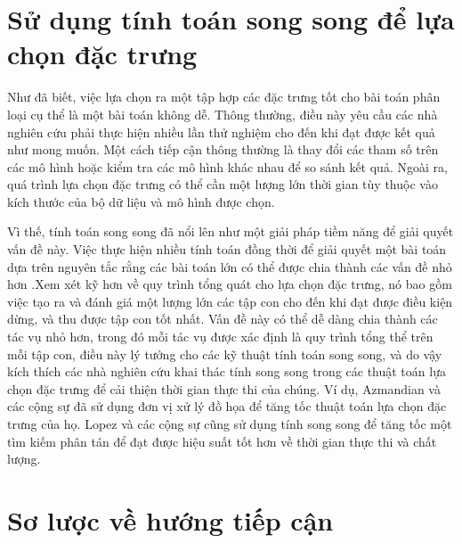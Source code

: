 \section{Sử dụng tính toán song song để lựa chọn đặc trưng}
Như đã biết, việc lựa chọn ra một tập hợp các đặc trưng tốt cho bài toán phân loại cụ thể là một bài toán không dễ. Thông thường, điều này yêu cầu các nhà nghiên cứu phải thực hiện nhiều lần thử nghiệm cho đến khi đạt được kết quả như mong muốn. Một cách tiếp cận thông thường là thay đổi các tham số trên các mô hình hoặc kiểm tra các mô hình khác nhau để so sánh kết quả. Ngoài ra, quá trình lựa chọn đặc trưng có thể cần một lượng lớn thời gian tùy thuộc vào kích thước của bộ dữ liệu và mô hình được chọn.

Vì thế, tính toán song song đã nổi lên như một giải pháp tiềm năng để giải quyết vấn đề này. Việc thực hiện nhiều tính toán đồng thời để giải quyết một bài toán dựa trên nguyên tắc rằng các bài toán lớn có thể được chia thành các vấn đề nhỏ hơn \cite{denning1990highly}.Xem xét kỹ hơn về quy trình tổng quát cho lựa chọn đặc trưng, nó bao gồm việc tạo ra và đánh giá một lượng lớn các tập con cho đến khi đạt được điều kiện dừng, và thu được tập con tốt nhất. Vấn đề này có thể dễ dàng chia thành các tác vụ nhỏ hơn, trong đó mỗi tác vụ được xác định là quy trình tổng thể trên mỗi tập con, điều này lý tưởng cho các kỹ thuật tính toán song song, và do vậy kích thích các nhà nghiên cứu khai thác tính song song trong các thuật toán lựa chọn đặc trưng để cải thiện thời gian thực thi của chúng. Ví dụ, Azmandian và các cộng sự \cite{azmandian2012gpu} đã sử dụng đơn vị xử lý đồ họa để tăng tốc thuật toán lựa chọn đặc trưng của họ. Lopez và các cộng sự \cite{lopez2006solving} cũng sử dụng tính song song để tăng tốc một tìm kiếm phân tán để đạt được hiệu suất tốt hơn về thời gian thực thi và chất lượng.

\section{Sơ lược về hướng tiếp cận}\label{section:preliminaire}

